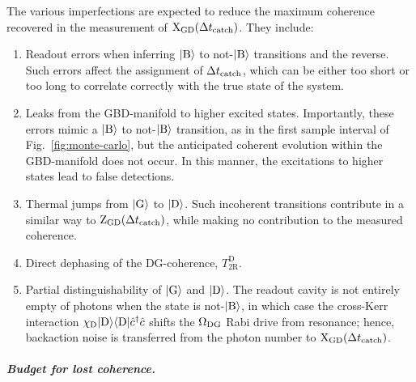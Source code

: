 The various imperfections are expected to reduce the maximum coherence
recovered in the measurement of ${\rm X}_{{\rm GD}}(\Delta t_{{\rm catch}})$.
They include: 
\begin{enumerate}
\item Readout errors when inferring $|{\rm B}\rangle$ to not-$|{\rm B}\rangle$
transitions and the reverse. Such errors affect the assignment of
$\Delta t_{{\rm catch}}$, which can be either too short or too long
to correlate correctly with the true state of the system. 
\item Leaks from the GBD-manifold to higher excited states. Importantly,
these errors mimic a $|{\rm B}\rangle$ to not-$|{\rm B}\rangle$
transition, as in the first sample interval of Fig.~\ref{fig:monte-carlo},
but the anticipated coherent evolution within the GBD-manifold does
not occur. In this manner, the excitations to higher states lead to
false detections.
\item Thermal jumps from $|{\rm G}\rangle$ to $|{\rm D}\rangle$. Such
incoherent transitions contribute in a similar way to ${\rm Z}_{{\rm GD}}(\Delta t_{{\rm catch}})$,
while making no contribution to the measured coherence. 
\item Direct dephasing of the DG-coherence, $T_{\mathrm{2R}}^{\mathrm{D}}$. 
\item Partial distinguishability of $|{\rm G}\rangle$ and $|{\rm D}\rangle$.
The readout cavity is not entirely empty of photons when the state
is not-$|{\rm B}\rangle$, in which case the cross-Kerr interaction
$\chi_{{\rm D}}|{\rm D}\rangle\langle{\rm D}|\hat{c}^{\dagger}\hat{c}$
shifts the $\Omega_{{\rm DG}}$ Rabi drive from resonance; hence,
backaction noise is transferred from the photon number to ${\rm X_{{\rm GD}}}(\Delta t_{{\rm catch}})$. 
\end{enumerate}

\paragraph{\textit{\emph{Budget for lost coherence.}}\emph{ }}

